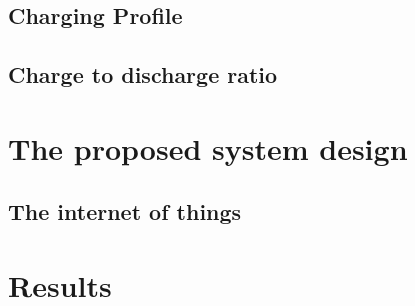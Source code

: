 \documentclass[a4paper, 10pt]{article}
\begin{document}
\subsection{Charging Profile}
\label{sec:charging}


\subsection{Charge to discharge ratio}
\label{sec:chargedischarge}


\section{The proposed system design}
\label{sec:proposed}



\subsection{The internet of things}
\label{sec:internet}



\section{Results}
\label{sec:result}


\end{document}
